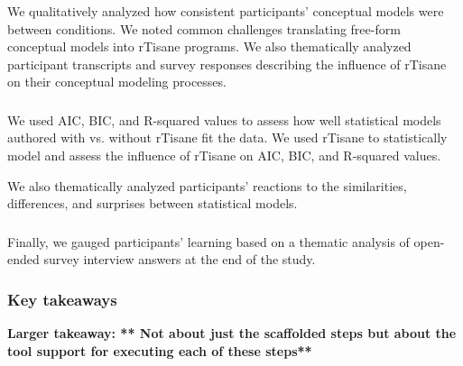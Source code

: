 We qualitatively analyzed how consistent participants' conceptual models were
between conditions. We noted common challenges translating free-form conceptual
models into rTisane programs. We also thematically analyzed participant
transcripts and survey responses describing the influence of rTisane on their
conceptual modeling processes. 


\subsubsection{\evalStatisticalModels}
We used AIC, BIC, and R-squared values to assess how well statistical models
authored with vs. without rTisane fit the data. We used rTisane to statistically
model and assess the influence of rTisane on AIC, BIC, and R-squared values.

We also thematically analyzed participants' reactions to the similarities,
differences, and surprises between statistical models. 


\subsubsection{\evalLearning}
Finally, we gauged participants' learning based on a thematic analysis of
open-ended survey interview answers at the end of the study. 


\subsubsection{Key takeaways}
\textbf{Larger takeaway: ** Not about just the scaffolded steps but about the tool support for executing each of these steps**}

